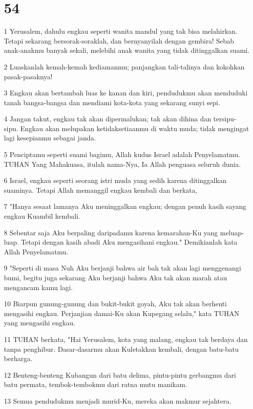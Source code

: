 \chapter{54}

\par 1 Yerusalem, dahulu engkau seperti wanita mandul yang tak bisa melahirkan. Tetapi sekarang bersorak-soraklah, dan bernyanyilah dengan gembira! Sebab anak-anakmu banyak sekali, melebihi anak wanita yang tidak ditinggalkan suami.
\par 2 Luaskanlah kemah-kemah kediamanmu; panjangkan tali-talinya dan kokohkan pasak-pasaknya!
\par 3 Engkau akan bertambah luas ke kanan dan kiri, pendudukmu akan menduduki tanah bangsa-bangsa dan mendiami kota-kota yang sekarang sunyi sepi.
\par 4 Jangan takut, engkau tak akan dipermalukan; tak akan dihina dan tersipu-sipu. Engkau akan melupakan ketidaksetiaanmu di waktu muda; tidak mengingat lagi kesepianmu sebagai janda.
\par 5 Penciptamu seperti suami bagimu, Allah kudus Israel adalah Penyelamatmu. TUHAN Yang Mahakuasa, itulah nama-Nya, Ia Allah penguasa seluruh dunia.
\par 6 Israel, engkau seperti seorang istri muda yang sedih karena ditinggalkan suaminya. Tetapi Allah memanggil engkau kembali dan berkata,
\par 7 "Hanya sesaat lamanya Aku meninggalkan engkau; dengan penuh kasih sayang engkau Kuambil kembali.
\par 8 Sebentar saja Aku berpaling daripadamu karena kemarahan-Ku yang meluap-luap. Tetapi dengan kasih abadi Aku mengasihani engkau." Demikianlah kata Allah Penyelamatmu.
\par 9 "Seperti di masa Nuh Aku berjanji bahwa air bah tak akan lagi menggenangi bumi, begitu juga sekarang Aku berjanji bahwa Aku tak akan marah atau mengancam kamu lagi.
\par 10 Biarpun gunung-gunung dan bukit-bukit goyah, Aku tak akan berhenti mengasihi engkau. Perjanjian damai-Ku akan Kupegang selalu," kata TUHAN yang mengasihi engkau.
\par 11 TUHAN berkata, "Hai Yerusalem, kota yang malang, engkau tak berdaya dan tanpa penghibur. Dasar-dasarmu akan Kuletakkan kembali, dengan batu-batu berharga.
\par 12 Benteng-benteng Kubangun dari batu delima, pintu-pintu gerbangmu dari batu permata, tembok-tembokmu dari ratna mutu manikam.
\par 13 Semua pendudukmu menjadi murid-Ku, mereka akan makmur sejahtera.
